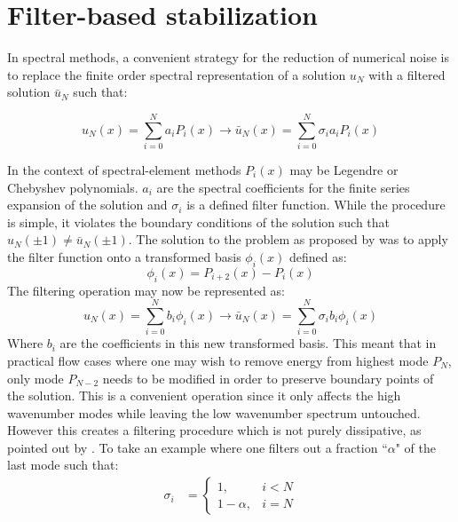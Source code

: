 \section{Filter-based stabilization}

In spectral methods, a convenient strategy for the reduction of numerical noise is to replace the finite order spectral representation of a solution $u_{N}$ with a filtered solution $\bar{u}_{N}$ such that:

\begin{equation}
 u_{N}(x) = \sum_{i=0}^{N}a_{i}P_{i}(x) \rightarrow \bar{u}_{N}(x) = \sum_{i=0}^{N}\sigma_{i}a_{i}P_{i}(x)
 \label{eqn:generic_filter}
\end{equation}

In the context of spectral-element methods $P_{i}(x)$ may be Legendre or Chebyshev polynomials. $a_{i}$ are the spectral coefficients for the finite series expansion of the solution and $\sigma_{i}$ is a defined filter function. While the procedure is simple, it violates the boundary conditions of the solution such that $u_{N}(\pm1) \neq \bar{u}_{N}(\pm1)$. The solution to the problem as proposed by \cite{boyd98} was to apply the filter function onto a transformed basis $\phi_{i}(x)$ defined as:
\begin{equation}
\label{eqn:boyd}
\phi_{i}(x) = P_{i+2}(x) - P_{i}(x)
\end{equation}
The filtering operation may now be represented as:
\begin{equation}
u_{N}(x) = \sum_{i=0}^{N}b_{i}\phi_{i}(x) \rightarrow \bar{u}_{N}(x) = \sum_{i=0}^{N}\sigma_{i}b_{i}\phi_{i}(x)
\end{equation}
Where $b_{i}$ are the coefficients in this new transformed basis. This meant that in practical flow cases where one may wish to remove energy from highest mode $P_{N}$, only mode $P_{N-2}$ needs to be modified in order to preserve boundary points of the solution. This is a convenient operation since it only affects the high wavenumber modes while leaving the low wavenumber spectrum untouched. However this creates a filtering procedure which is not purely dissipative, as pointed out by \cite{pasquetti02}. To take an example where one filters out a fraction ``$\alpha$" of the last mode such that:
\begin{align}
\sigma_{i} &=
	\begin{cases}
		1, & i<N \\
		1 - \alpha, & i=N
	\end{cases}
\end{align}
